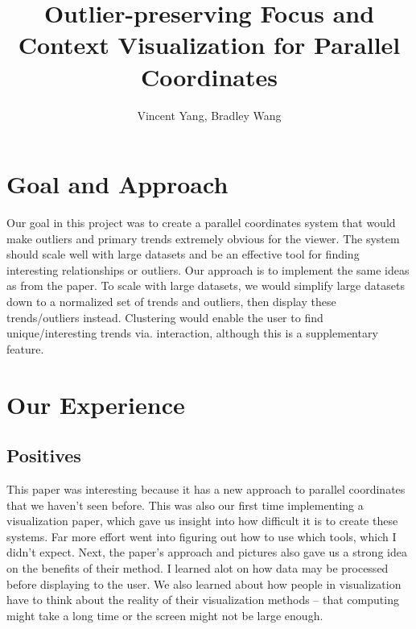 \documentclass[	DIV=calc,%
			paper=a4,%
			fontsize=11pt,%
			twocolumn]{scrartcl}					%
\title{Outlier-preserving Focus and Context Visualization for Parallel Coordinates}		%
\author{Vincent Yang, Bradley Wang }			%
\date{}										%
\begin{document}
\maketitle
\thispagestyle{fancy} 								%



\section {Goal and Approach}
Our goal in this project was to create a parallel coordinates system that would make outliers and primary trends extremely obvious for the viewer. The system should scale well with large datasets and be an effective tool for finding interesting relationships or outliers. 
Our approach is to implement the same ideas as from the paper. To scale with large datasets, we would simplify large datasets down to a normalized set of trends and outliers, then display these trends/outliers instead. Clustering would enable the user to find unique/interesting trends via. interaction, although this is a supplementary feature. 


\section {Our Experience}

\subsection {Positives}
This paper was interesting because it has a new approach to parallel coordinates that we haven't seen before. This was also our first time implementing a visualization paper, 
which gave us insight into how difficult it is to create these systems. Far more effort went into figuring out how to use which tools, which I didn't expect. Next, the paper's approach
and pictures also gave us a strong idea on the benefits of their method. I learned alot on how data may be processed before displaying to the user. We also learned about
how people in visualization have to think about the reality of their visualization methods -- that computing might take a long time or the screen might not be large enough. 
\end{document}
